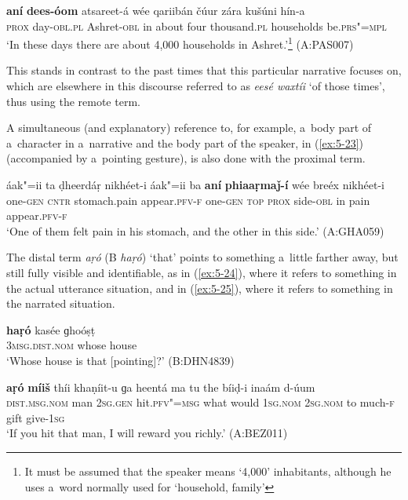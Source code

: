 \begin{exe}
\ex
\label{ex:5-22}
\gll \textbf{aní} \textbf{dees-óom} atsareet-á wée qariibán čúur zára kušúni
hín-a \\
\textsc{prox} day-\textsc{obl.pl} Ashret-\textsc{obl} in about four thousand.\textsc{pl} households
be.\textsc{prs"=mpl} \\
\glt `In these days there are about 4,000 households in Ashret.'\footnote{It must be assumed that the speaker means `4,000' inhabitants, although he uses a~word normally used for `household, family'} (A:PAS007)
\end{exe}
This stands in contrast to the past times that this particular narrative focuses on, which are elsewhere in this discourse referred to as \textit{eesé waxtíi} `of those times', thus using the remote term.

A simultaneous (and explanatory) reference to, for example, a~body part of a~character in a~narrative and the body part of the speaker, in (\ref{ex:5-23}) (accompanied by a~pointing gesture), is also done with the proximal term.


\begin{exe}
\ex
\label{ex:5-23}
\gll áak"=ii ta ḍheerdáṛ nikhéet-i áak"=ii ba \textbf{aní} \textbf{phiaaṛmaǰ-í} wée breéx nikhéet-i\\
one-\textsc{gen} \textsc{cntr} stomach.pain appear.\textsc{pfv-f} one-\textsc{gen} \textsc{top}
\textsc{prox} side-\textsc{obl} in pain appear.\textsc{pfv-f}\\
\glt `One of them felt pain in his stomach, and the other in this side.' (A:GHA059)
\end{exe}
The distal term \textit{aṛó} (B \textit{haṛó}) `that' points to something a~little farther away, but still fully visible and identifiable, as in (\ref{ex:5-24}), where it refers to something in the actual utterance situation, and in (\ref{ex:5-25}), where it refers to something in the narrated situation. 

\begin{exe}
\ex
\label{ex:5-24}
\gll \textbf{haṛó} kasée ɡhoóṣṭ \\
\textsc{3msg.dist.nom} whose house \\
\glt `Whose house is that [pointing]?' (B:DHN4839)

\ex
\label{ex:5-25}
\gll \textbf{aṛó} \textbf{míiš} thíi khaṇíit-u ɡa heentá ma tu the bíiḍ-i inaám d-úum \\
\textsc{dist.msg.nom} man \textsc{2sg.gen} hit.\textsc{pfv"=msg} what would \textsc{1}\textsc{sg.nom} 
\textsc{2sg.nom} to much-\textsc{f} gift give-\textsc{1}\textsc{sg} \\
\glt `If you hit that man, I will reward you richly.' (A:BEZ011)
\end{exe}

